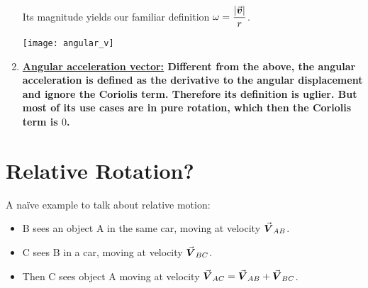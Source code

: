 \documentclass[class=article, crop=false, 12pt]{standalone}
\begin{document}
\begin{enumerate}
    \begin{minipage}{0.6\linewidth}
        Its magnitude yields our familiar definition $\displaystyle \omega = \frac{|\va*{v}|}{r}$.
    \end{minipage}
    \hspace{0.01\textwidth}
    \begin{minipage}{0.32\linewidth}
        \centering
        \texttt{[image: angular\_v]}
    \end{minipage}

    
    \item \bf{\ul{Angular acceleration vector:}}
    Different from the above, the angular acceleration is defined as the  derivative to the angular displacement and ignore the Coriolis term. 
    Therefore its definition is uglier. But most of its use cases are in pure rotation, which then the Coriolis term is $0$.
\end{enumerate}



\linesep
\section{Relative Rotation?}

A naïve example to talk about relative motion:
\begin{itemize}
    \item B sees an object A in the same car, moving at velocity $\va*{V}_{AB}$. 
    \item C sees B in a car, moving at velocity $\va*{V}_{BC}$.
    \item Then C sees object A moving at velocity $\va*{V}_{AC}=\va*{V}_{AB}+\va*{V}_{BC}$. 
\end{itemize}
\end{document}
